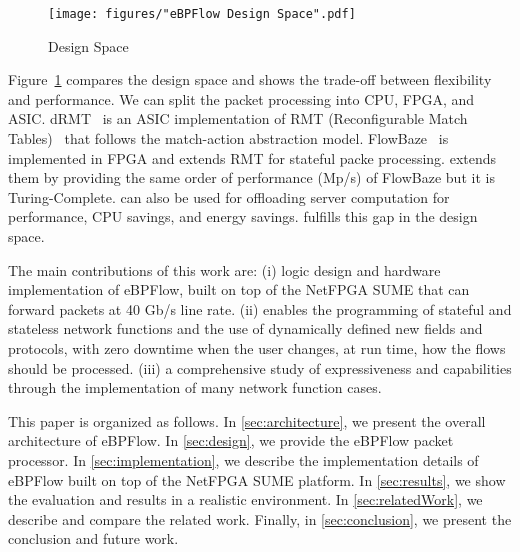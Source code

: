  \begin{figure}[t]
 \centering
\texttt{[image: figures/"eBPFlow Design Space".pdf]}
 \caption{Design Space}
 \label{fig:Comparison}
 \end{figure}

Figure~\ref{fig:Comparison} compares the design space and shows the trade-off between flexibility and performance. 
We can split the packet processing into CPU, FPGA, and ASIC.
dRMT~\cite{chole2017drmt} is an ASIC implementation of RMT (Reconfigurable Match Tables)~\cite{bosshart2013forwarding} that follows the match-action abstraction model. FlowBaze~\cite{FlowBlaze2019} is implemented in FPGA and extends RMT for stateful packe processing.
\system extends them by providing the same order of performance (Mp/s) of FlowBaze but it is Turing-Complete.
\system can also be used for offloading server computation for performance, CPU savings, and energy savings. 
\system fulfills this gap in the design space.






The main contributions of this work are: 
(i) logic design and hardware implementation of eBPFlow, built on top of the NetFPGA SUME that can forward packets at 40 Gb/s line rate.
(ii) \system enables the programming of stateful and stateless network functions and the use of dynamically defined new fields and protocols, with zero downtime when the user changes, at run time, how the flows should be processed.
(iii) a comprehensive study of \system expressiveness and capabilities through the implementation of many network function cases.


This paper is organized as follows. In \textsection\ref{sec:architecture}, we present the overall architecture of eBPFlow. In \textsection\ref{sec:design}, we provide the eBPFlow packet processor. In \textsection\ref{sec:implementation}, we describe the implementation details of eBPFlow built on top of the NetFPGA SUME platform. In \textsection\ref{sec:results}, we show the evaluation and results in a realistic environment. 
In \textsection\ref{sec:relatedWork}, we describe and compare the related work. Finally, in \textsection\ref{sec:conclusion}, we present the conclusion and future work.
